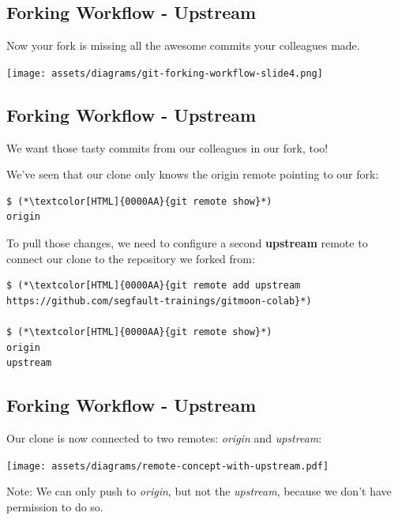 \subsection{Forking Workflow - Upstream}
\begin{frame}[fragile]
  \subslidetitle

  Now your fork is missing all the awesome commits your colleagues made.

  \vspace{2em}
  \centerline{\texttt{[image: assets/diagrams/git-forking-workflow-slide4.png]}}

\end{frame}

\subsection{Forking Workflow - Upstream}
\begin{frame}[fragile]
  \subslidetitle

  We want those tasty commits from our colleagues in our fork, too!

  We've seen that our clone only knows the origin remote pointing to our fork:

  \begin{lstlisting}
$ (*\textcolor[HTML]{0000AA}{git remote show}*)
origin
\end{lstlisting}

  To pull those changes, we need to configure a second \textbf{upstream} remote
  to connect our clone to the repository we forked from:

  \begin{lstlisting}
$ (*\textcolor[HTML]{0000AA}{git remote add upstream https://github.com/segfault-trainings/gitmoon-colab}*)

$ (*\textcolor[HTML]{0000AA}{git remote show}*)
origin
upstream
\end{lstlisting}

\end{frame}

\subsection{Forking Workflow - Upstream}
\begin{frame}[fragile]
  \subslidetitle

  Our clone is now connected to two remotes: \textit{origin} and \textit{upstream}:

  \vspace{3em}
  \centerline{\texttt{[image: assets/diagrams/remote-concept-with-upstream.pdf]}}

  \vspace{1em}
  Note: We can only push to \textit{origin}, but not the \textit{upstream}, because
  we don't have permission to do so.

\end{frame}

